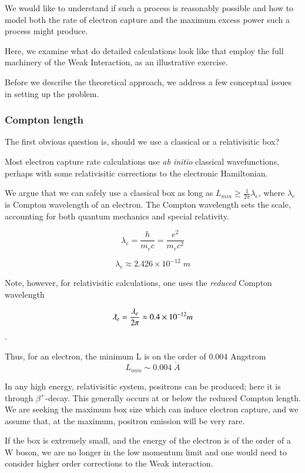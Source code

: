 \documentclass[%
 aip,
 jmp,%
 amsmath,amssymb,
 reprint,%
]{revtex4-1}
\begin{document}
We would like to understand if such a process is reasonably possible and how to model both the rate of electron capture and the maximum excess power such a process might produce.

Here, we examine what do detailed calculations look like that employ the full machinery of the Weak Interaction, as an illustrative exercise.

Before we describe the theoretical approach, we address a few conceptual issues in setting up the problem.

\subsubsection{Compton length}
The first obvious question is, should we use a classical or a relativisitic box?   

Most electron capture rate calculations use \emph{ab initio} classical wavefunctions,\cite{ec-review1,ec-review2} perhaps with some relativisitic corrections to the electronic Hamiltonian. \cite{martin}

We argue that we can safely use a classical box as long as $L_{min} \ge \frac{1}{2\pi}\lambda_{e}$, where $\lambda_{e}$ is Compton wavelength of an electron. \cite{relbox,compton,planck}  The Compton wavelength sets the scale, accounting for both quantum mechanics and special relativity.

$$\lambda_{e}=\dfrac{h}{m_{e}c}=\dfrac{e^{2}}{m_{e}c^{2}}$$

$$\lambda_{e}\approx2.426\times 10^{-12}\;m$$

Note, however,  for relativisitic calculations, one uses the \emph{reduced} Compton wavelength 

$$\lambdabar_{e}=\frac{\lambda_{e}}{2\pi}\approx0.4\times 10^{-12}m$$.

Thus, for an electron, the minimum L is on the order of 0.004 Angstrom 
$$L_{min}\sim0.004\;\mathring{A}$$ 

In any high energy, relativisitic system, positrons can be produced; here it is through $\beta^{+}$-decay. This generally occurs at or below the reduced Compton length. We are seeking the maximum box size which can induce electron capture, and we assume that, at the maximum, positron emission will be very rare.

If the box is extremely small, and the energy of the electron is of the order of a W boson, we are no longer in the low momentum limit and one would need to consider higher order corrections to the Weak interaction.\cite{klein1}
\end{document}
